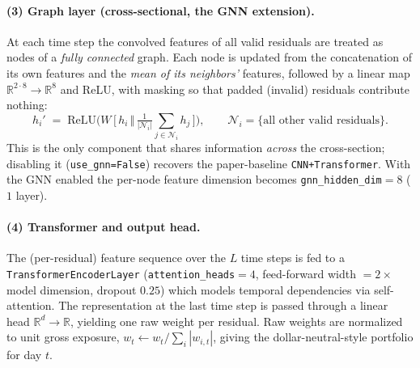 \documentclass[11pt]{article}
\begin{document}
\paragraph{(3) Graph layer (cross-sectional, the GNN extension).} At each time step
the convolved features of all valid residuals are treated as nodes of a
\emph{fully connected} graph. Each node is updated from the concatenation of its own
features and the \emph{mean of its neighbors'} features, followed by a linear map
$\mathbb{R}^{2\cdot 8}\!\to\!\mathbb{R}^{8}$ and ReLU, with masking so that padded
(invalid) residuals contribute nothing:
\begin{equation}
  h_i' \;=\; \mathrm{ReLU}\!\Big(W\,\big[\,h_i \,\Vert\, \tfrac{1}{|\mathcal{N}_i|}\!\sum_{j\in\mathcal{N}_i} h_j\,\big]\Big),
  \qquad \mathcal{N}_i = \{\text{all other valid residuals}\}.
\end{equation}
This is the only component that shares information \emph{across} the cross-section;
disabling it (\texttt{use\_gnn=False}) recovers the paper-baseline
\texttt{CNN+Transformer}. With the GNN enabled the per-node feature dimension becomes
\texttt{gnn\_hidden\_dim}$=8$ ($1$ layer).

\paragraph{(4) Transformer and output head.} The (per-residual) feature sequence over
the $L$ time steps is fed to a \texttt{TransformerEncoderLayer}
(\texttt{attention\_heads}$=4$, feed-forward width $=2\times$ model dimension, dropout
$0.25$) which models temporal dependencies via self-attention. The representation at
the last time step is passed through a linear head $\mathbb{R}^{d}\!\to\!\mathbb{R}$,
yielding one raw weight per residual. Raw weights are normalized to unit gross
exposure, $w_t \leftarrow w_t / \sum_i |w_{i,t}|$, giving the dollar-neutral-style
portfolio for day $t$.
\end{document}

